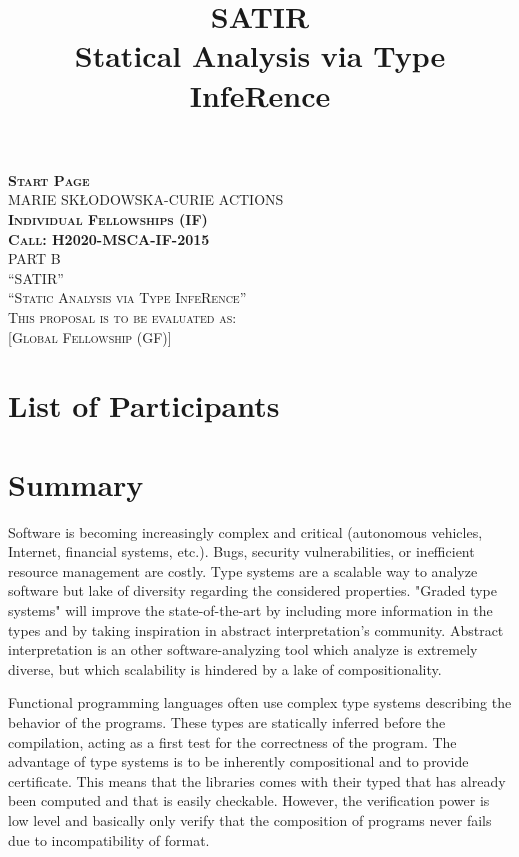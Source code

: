 \documentclass{article}[11pt]
\title{SATIR\\ Statical Analysis via Type InfeRence}
\begin{document}
\begin{titlepage} 
  \vspace*{1.5cm}%
  \begin{center}
    \textsc{\huge\bf Start Page}\\[1.5cm]
    \textsc{\huge MARIE SKŁODOWSKA-CURIE ACTIONS}\\[1.5cm]
    \textsc{\bf\LARGE Individual Fellowships (IF)}\\
    \textsc{\bf\LARGE Call: H2020-MSCA-IF-2015}\\[1.5cm]
    \textsc{\LARGE PART B}\\[4cm] 
    \textsc{\Huge ``SATIR''}\\[0.5cm]
    \textsc{\LARGE ``Static Analysis via Type InfeRence''}\\[9cm]
    \textsc{\LARGE This proposal is to be evaluated as:}\\[0.5cm]
    \textsc{\LARGE [Global Fellowship (GF)]}
  \end{center} 
\end{titlepage}

\tableofcontents

\newpage

\section*{List of Participants}

\newpage


\section{Summary}

Software is becoming increasingly complex and critical (autonomous vehicles, Internet, financial systems, etc.). Bugs, security vulnerabilities, or inefficient resource management are costly. Type systems are a scalable way to analyze software but lake of diversity regarding the considered properties. "Graded type systems" will improve the state-of-the-art by including more information in the types and by taking inspiration in abstract interpretation's community. Abstract interpretation is an other software-analyzing tool which analyze is extremely diverse, but which scalability is hindered by a lake of compositionality.

Functional programming languages often use complex type systems describing the behavior of the programs. These types are statically inferred before the compilation, acting as a first test for the correctness of the program. The advantage of type systems is to be inherently compositional and to provide certificate. This means that the libraries comes with their typed that has already been computed and that is easily checkable. However, the verification power is low level and basically only verify that the composition of programs never fails due to incompatibility of format.
\end{document}
